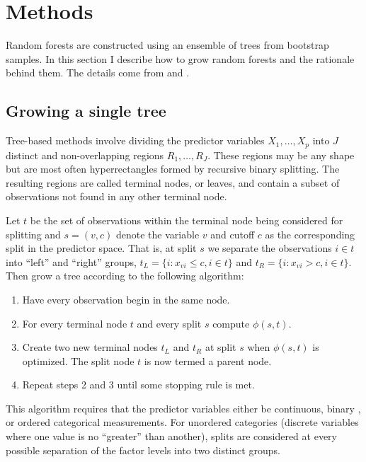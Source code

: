 \section{Methods}

Random forests are constructed using an ensemble of trees from bootstrap samples. In this section I describe how to grow random forests and the rationale behind them. The details come from \cite{segal:2011} and \cite{james:2013}.

\subsection{Growing a single tree}

Tree-based methods involve dividing the predictor variables $X_1,\ldots,X_p$ into $J$ distinct and non-overlapping regions $R_1,\ldots,R_J$. These regions may be any shape but are most often hyperrectangles formed by recursive binary splitting. The resulting regions are called terminal nodes, or leaves, and contain a subset of observations not found in any other terminal node. 

Let $t$ be the set of observations within the terminal node being considered for splitting and $s=(v, c)$ denote the variable $v$ and cutoff $c$ as the corresponding split in the predictor space. That is, at split $s$ we separate the observations $i\in t$ into ``left'' and ``right'' groups, $t_L=\{i:x_{vi}\leq c, i\in t\}$ and $t_R=\{i:x_{vi} > c, i\in t\}$. Then grow a tree according to the following algorithm:
\begin{enumerate}
\item Have every observation begin in the same node.
\item For every terminal node $t$ and every split $s$ compute $\phi(s, t)$.
\item Create two new terminal nodes $t_L$ and $t_R$ at split $s$ when $\phi(s, t)$ is optimized. The split node $t$ is now termed a parent node.
\item Repeat steps 2 and 3 until some stopping rule is met.%
\end{enumerate}
This algorithm requires that the predictor variables either be continuous, binary , or ordered categorical measurements. For unordered categories (discrete variables where one value is no ``greater'' than another), splits are considered at every possible separation of the factor levels into two distinct groups.

